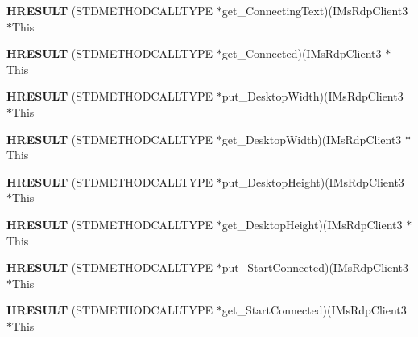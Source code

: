 \begin{DoxyCompactItemize}
{\bfseries H\+R\+E\+S\+U\+LT} (S\+T\+D\+M\+E\+T\+H\+O\+D\+C\+A\+L\+L\+T\+Y\+PE $\ast$get\+\_\+\+Connecting\+Text)(I\+Ms\+Rdp\+Client3 $\ast$This
\item 
\mbox{\label{struct_i_ms_rdp_client3_vtbl_a1c1fb6a14eec0683af898969ea3f35fe}} 
{\bfseries H\+R\+E\+S\+U\+LT} (S\+T\+D\+M\+E\+T\+H\+O\+D\+C\+A\+L\+L\+T\+Y\+PE $\ast$get\+\_\+\+Connected)(I\+Ms\+Rdp\+Client3 $\ast$This
\item 
\mbox{\label{struct_i_ms_rdp_client3_vtbl_accbb2ed5600494e068e8dac7a05f9b52}} 
{\bfseries H\+R\+E\+S\+U\+LT} (S\+T\+D\+M\+E\+T\+H\+O\+D\+C\+A\+L\+L\+T\+Y\+PE $\ast$put\+\_\+\+Desktop\+Width)(I\+Ms\+Rdp\+Client3 $\ast$This
\item 
\mbox{\label{struct_i_ms_rdp_client3_vtbl_aec4d536e3ef3360792e7282d7fa7f86a}} 
{\bfseries H\+R\+E\+S\+U\+LT} (S\+T\+D\+M\+E\+T\+H\+O\+D\+C\+A\+L\+L\+T\+Y\+PE $\ast$get\+\_\+\+Desktop\+Width)(I\+Ms\+Rdp\+Client3 $\ast$This
\item 
\mbox{\label{struct_i_ms_rdp_client3_vtbl_aaccb85df4af4d1f336b7a257ee0e95f4}} 
{\bfseries H\+R\+E\+S\+U\+LT} (S\+T\+D\+M\+E\+T\+H\+O\+D\+C\+A\+L\+L\+T\+Y\+PE $\ast$put\+\_\+\+Desktop\+Height)(I\+Ms\+Rdp\+Client3 $\ast$This
\item 
\mbox{\label{struct_i_ms_rdp_client3_vtbl_a4931e52e7fc2cc7f09e9669bb98aad31}} 
{\bfseries H\+R\+E\+S\+U\+LT} (S\+T\+D\+M\+E\+T\+H\+O\+D\+C\+A\+L\+L\+T\+Y\+PE $\ast$get\+\_\+\+Desktop\+Height)(I\+Ms\+Rdp\+Client3 $\ast$This
\item 
\mbox{\label{struct_i_ms_rdp_client3_vtbl_a22cd373f2423d9f96ebc30159693d379}} 
{\bfseries H\+R\+E\+S\+U\+LT} (S\+T\+D\+M\+E\+T\+H\+O\+D\+C\+A\+L\+L\+T\+Y\+PE $\ast$put\+\_\+\+Start\+Connected)(I\+Ms\+Rdp\+Client3 $\ast$This
\item 
\mbox{\label{struct_i_ms_rdp_client3_vtbl_ae7d508a50cfc0a3bcffe1934c2227314}} 
{\bfseries H\+R\+E\+S\+U\+LT} (S\+T\+D\+M\+E\+T\+H\+O\+D\+C\+A\+L\+L\+T\+Y\+PE $\ast$get\+\_\+\+Start\+Connected)(I\+Ms\+Rdp\+Client3 $\ast$This
\item 

\end{DoxyCompactItemize}
